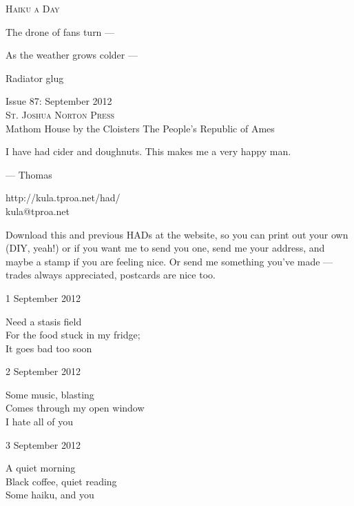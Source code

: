 \documentclass[12pt]{article}
\begin{document}
\begin{center}
{\fontsize{36}{48}\selectfont \textsc{Haiku a Day }}
\end{center}

\vspace*{3.5cm}

{\fontsize{20}{40}\selectfont 

The drone of fans turn ---

As the weather grows colder ---

Radiator glug


}

\vspace*{5.0cm}
\begin{center}
{\large{Issue 87: September 2012}} \\[5mm]
{\fontsize{8}{8}\selectfont  \textsc{ St. Joshua Norton Press }} \\[1mm]
{\fontsize{6}{6}\selectfont Mathom House by the Cloisters \textbar The People's Republic of Ames }
\end{center}


\newpage

I have had cider and doughnuts. This makes me a very
happy man.

--- Thomas

http://kula.tproa.net/had/ \\
kula@tproa.net

Download this and previous HADs at the website, so you can
print out your own (DIY, yeah!) or if you want me to send
you one, send me your address, and maybe a stamp if you
are feeling nice. Or send me something you've made ---
trades always appreciated, postcards are nice too.

\vfill

1 September 2012

Need a stasis field \\
For the food stuck in my fridge; \\
It goes bad too soon

2 September 2012

Some music, blasting \\
Comes through my open window \\
I hate all of you

\newpage

3 September 2012

A quiet morning \\
Black coffee, quiet reading \\
Some haiku, and you
\end{document}

